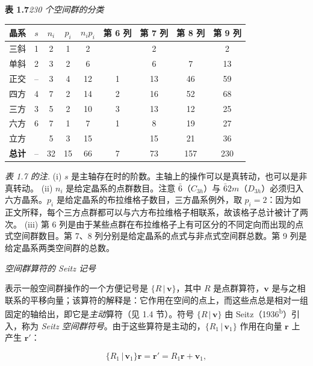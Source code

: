 \begin{table}[H]
\centering
\textbf{表 1.7}\quad \textit{230 个空间群的分类}

\smallskip
\begin{tabular}{|l|c|c|c|c|c|c|c|c|}
\hline
晶系 & $s$ & $n_{i}$ & $p_{i}$ & $n_{i}p_{i}$ & 第 6 列 & 第 7 列 & 第 8 列 & 第 9 列 \\ \hline
三斜 & 1 & 2 & 1 & 2 & & 2 & & 2 \\ \hline
单斜 & 2 & 3 & 2 & 6 & & 6 & 7 & 13 \\ \hline
正交 & -- & 3 & 4 & 12 & 1 & 13 & 46 & 59 \\ \hline
四方 & 4 & 7 & 2 & 14 & 2 & 16 & 52 & 68 \\ \hline
三方 & 3 & 5 & 2 & 10 & 3 & 13 & 12 & 25 \\ \hline
六方 & 6 & 7 & 1 & 7 & 1 & 8 & 19 & 27 \\ \hline
立方 & & 5 & 3 & 15 & & 15 & 21 & 36 \\ \hline
\textbf{总计} & -- & 32 & 15 & 66 & 7 & 73 & 157 & 230 \\ \hline
\end{tabular}

\smallskip
\parbox{0.92\textwidth}{\textit{表 1.7 的注.}
(i) $s$ 是主轴存在时的阶数。主轴上的操作可以是真转动，也可以是非真转动。
(ii) $n_{i}$ 是给定晶系的点群数目。注意 $\bar{6}$（$C_{3h}$）与 $\bar{6}2m$（$D_{3h}$）必须归入六方晶系。$p_{i}$ 是给定晶系的布拉维格子数目，三方晶系例外，取 $p_{i} = 2$：因为如正文所释，每个三方点群都可以与六方布拉维格子相联系，故该格子总计被计了两次。
(iii) 第 6 列是由于某些点群在布拉维格子上有可区分的不同定向而出现的点式空间群数目。第 7、8 列分别是给定晶系的点式与非点式空间群总数。第 9 列是给定晶系两类空间群的总数。}
\end{table}

\textit{空间群算符的 Seitz 记号}

表示一般空间群操作的一个方便记号是 $\{R \,|\, \mathbf{v}\}$，其中 $R$ 是点群算符，$\mathbf{v}$ 是与之相联系的平移向量；该算符的解释是：它作用在空间的点上，而这些点总是相对一组固定的轴给出，即它是\textit{主动}算符（见 1.4 节）。符号 $\{R \,|\, \mathbf{v}\}$ 由 Seitz（1936\textsuperscript{b}）引入，称为 \textit{Seitz 空间群符号}。由于这些算符是主动的，$\{R_{1} \,|\, \mathbf{v}_{1}\}$ 作用在向量 $\mathbf{r}$ 上产生 $\mathbf{r}'$：

\begin{equation*}
\{R_{1} \,|\, \mathbf{v}_{1}\}\mathbf{r} = \mathbf{r}' = R_{1}\mathbf{r} + \mathbf{v}_{1},
\tag{1.5.2}
\end{equation*}

